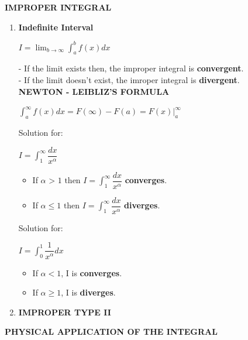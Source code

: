 \documentclass[10pt]{article}
\begin{document}
\pagebreak
\begin{center}
\textbf{IMPROPER INTEGRAL}
\end{center}
\begin{enumerate}
	\item \textbf{Indefinite Interval}\\
	 \begin{mybox}
	 \begin{center}
	 $I = \displaystyle \lim_{b \to \infty} \int_{a}^{b} f(x)dx$
	 \end{center}
	 \end{mybox}
	 - If the limit exists then, the improper integral is \textbf{convergent}.\\
	 - If the limit doesn't exist, the imroper integral is \textbf{divergent}.\\
	 \textbf{NEWTON - LEIBLIZ'S FORMULA}\\
	 \begin{mybox}
	 \begin{center}
	 $ \displaystyle \int_{a}^{\infty} f(x)dx = F(\infty) - F(a) = F(x)|_a^{\infty}$
	 \end{center}
	 \end{mybox}
	 Solution for:
	 \begin{center}
	 $I = \displaystyle \int_{1}^{\infty} \dfrac{dx}{x^{\alpha}}$
	 \end{center}
	 \begin{itemize}
	 \item If $\alpha \mbox{ > 1 then } I = \displaystyle \int_{1}^{\infty} \dfrac{dx}{x^{\alpha}}$ \textbf{converges}.
	 \item If $\alpha \le 1 \mbox{ then } I = \displaystyle \int_{1}^{\infty} \dfrac{dx}{x^{\alpha}}$ \textbf{diverges}.
	 \end{itemize}
	 Solution for:
	 \begin{center}
	 $I = \displaystyle \int_{0}^{1} \dfrac{1}{x^{\alpha}}dx$
	 \end{center}
	 \begin{itemize}
	 	\item If $\alpha < 1$, I is \textbf{converges}.
	 	\item If $\alpha \ge 1$, I is \textbf{diverges}.
	 \end{itemize}	  
	 \item \textbf{IMPROPER TYPE II}\\
\end{enumerate}
\pagebreak
\begin{center}
\textbf{PHYSICAL APPLICATION OF THE INTEGRAL}
\end{center}
\end{document}
